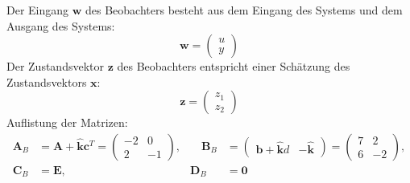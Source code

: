 \documentclass{article}
\begin{document}
\begin{task}
\begin{enumerate}[i]
\begin{solution}
Der Eingang $\mathbf{w}$ des Beobachters besteht aus dem Eingang des Systems und dem Ausgang des Systems:
\[\mathbf{w} = \begin{pmatrix}
u \\ y
\end{pmatrix}
\]
Der Zustandsvektor $\mathbf{z}$ des Beobachters entspricht einer Schätzung des Zustandsvektors $\mathbf{x}$:
\[\mathbf{z} = \begin{pmatrix}
z_1 \\ z_2
\end{pmatrix}
\]
Auflistung der Matrizen:
\[
\begin{aligned}
\mathbf{A}_B &= \mathbf{A}+\hat{\mathbf{k}} \mathbf{c}^{T} = \begin{pmatrix}
-2 & 0 \\
2 & -1
\end{pmatrix}, &\quad
\mathbf{B}_B &= 
\begin{pmatrix}
\mathbf{b}+\hat{\mathbf{k}} d &  - \hat{\mathbf{k}}
\end{pmatrix}
= \begin{pmatrix}
7 & 2 \\
6 & -2
\end{pmatrix},\\
\mathbf{C}_B &= \mathbf{E},
&
\mathbf{D}_B &= \mathbf{0}
\end{aligned}
\]
\end{solution}

\end{enumerate}
\end{task}
\end{document}
